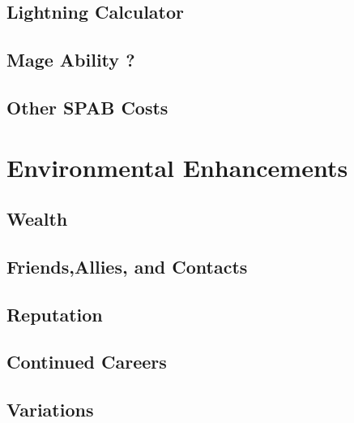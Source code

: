\subsection{Lightning Calculator}
\subsection{Mage Ability ?}
\subsection{Other SPAB Costs}
\section{Environmental Enhancements}
\subsection{Wealth}
\subsection{Friends,Allies, and Contacts}
\subsection{Reputation}
\subsection*{Continued Careers}
\subsection{Variations}
